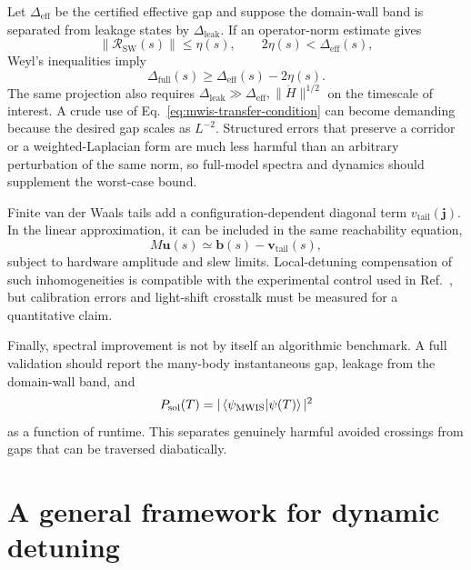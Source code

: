 Let $\Delta_{\mathrm{eff}}$ be the certified effective gap and suppose the
domain-wall band is separated from leakage states by $\Delta_{\mathrm{leak}}$.
If an operator-norm estimate gives
\begin{equation}
 \|\mathcal R_{\mathrm{SW}}(s)\|\leq\eta(s),
 \qquad
 2\eta(s)<\Delta_{\mathrm{eff}}(s),
 \label{eq:mwis-transfer-condition}
\end{equation}
Weyl's inequalities imply
\begin{equation}
 \Delta_{\mathrm{full}}(s)
 \geq\Delta_{\mathrm{eff}}(s)-2\eta(s).
 \label{eq:mwis-weyl-transfer}
\end{equation}
The same projection also requires
$\Delta_{\mathrm{leak}}\gg\Delta_{\mathrm{eff}},\|\dot H\|^{1/2}$ on the
timescale of interest.  A crude use of Eq.~\eqref{eq:mwis-transfer-condition}
can become demanding because the desired gap scales as $L^{-2}$.  Structured
errors that preserve a corridor or a weighted-Laplacian form are much less
harmful than an arbitrary perturbation of the same norm, so full-model spectra
and dynamics should supplement the worst-case bound.

Finite van der Waals tails add a configuration-dependent diagonal term
$v_{\mathrm{tail}}(\mathbf j)$.  In the linear approximation, it can be
included in the same reachability equation,
\begin{equation}
 M\mathbf u(s)\simeq
 \mathbf b(s)-\mathbf v_{\mathrm{tail}}(s),
 \label{eq:mwis-tail-compensation}
\end{equation}
subject to hardware amplitude and slew limits.  Local-detuning compensation
of such inhomogeneities is compatible with the experimental control used in
Ref.~\cite{oliveira2025demonstration}, but calibration errors and light-shift
crosstalk must be measured for a quantitative claim.

Finally, spectral improvement is not by itself an algorithmic benchmark.  A
full validation should report the many-body instantaneous gap, leakage from
the domain-wall band, and
\begin{equation}
 P_{\mathrm{sol}}(T)=
 |\braket{\psi_{\mathrm{MWIS}}}{\psi(T)}|^2
 \label{eq:mwis-success-probability}
\end{equation}
as a function of runtime.  This separates genuinely harmful avoided
crossings from gaps that can be traversed diabatically.

\section{A general framework for dynamic detuning}
\label{sec:mwis-general-framework}


